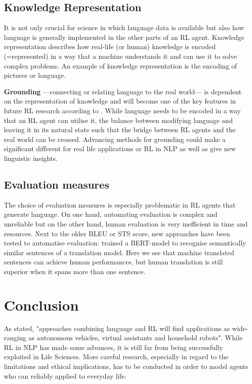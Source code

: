 \documentclass[11pt,a4paper]{article}
\begin{document}
\subsection{Knowledge Representation}
It is not only crucial for science in which language data is available but also how language is generally implemented in the other parts of an RL agent. Knowledge representation describes how real-life (or human) knowledge is encoded (=represented) in a way that a machine understands it and can use it to solve complex problems. An example of knowledge representation is the encoding of pictures or language.
\par

\textbf{Grounding} ---connecting or relating language to the real world--- is dependent on the representation of knowledge and will become one of the key features in future RL research according to \citet{narasimhan-2018}. While language needs to be encoded in a way that an RL agent can utilise it, the balance between modifying language and leaving it in its natural state such that the bridge between RL agents and the real world can be crossed. Advancing methods for grounding could make a significant different for real life applications or RL in NLP as well as give new linguistic insights.

\subsection{Evaluation measures}
The choice of evaluation measures is especially problematic in RL agents that generate language. On one hand, automating evaluation is complex and unreliable but on the other hand, human evaluation is very inefficient in time and resources. Next to the older BLEU or STS score, new approaches have been tested to automatise evaluation: \citet{yasui-etal-2019} trained a BERT-model to recognise semantically similar sentences of a translation model. Here we see that machine translated sentences can achieve human performances, but human translation is still superior when it spans more than one sentence.


\section{Conclusion}
As  \citet{ijcai2019} stated, "approaches combining language and RL will find applications as wide-ranging as autonomous vehicles, virtual assistants and household robots". While RL in NLP has made some advances, it is still far from being successfully exploited in Life Sciences. More careful research, especially in regard to the limitations and ethical implications, has to be conducted in order to model agents who can reliably applied to everyday life. 

\newpage

\end{document}

